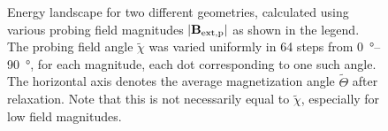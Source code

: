 \documentclass[11pt,a4paper,english,twoside]{article}
\begin{document}
\begin{figure}
\begin{subfigure}[b]{0.8\textwidth}
         \label{fig:barrierLandscape-sweepBext_r0.482}
     \end{subfigure}
    \caption{Energy landscape for two different geometries, calculated using various probing field magnitudes $\abs{\vb{B_\mathrm{ext,p}}}$ as shown in the legend. The probing field angle $\widetilde{\chi}$ was varied uniformly in 64 steps from \SIrange{0}{90}{\degree}, for each magnitude, each dot corresponding to one such angle. The horizontal axis denotes the average magnetization angle $\widetilde{\Theta}$ after relaxation. Note that this is not necessarily equal to $\widetilde{\chi}$, especially for low field magnitudes.}
    \label{fig:barrierLandscape-sweepBext}
\end{figure}

\end{document}

